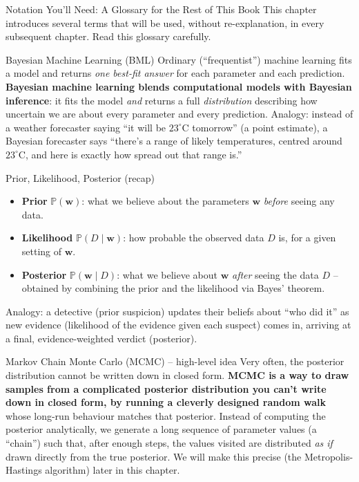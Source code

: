 \documentclass[aspectratio=169,10pt]{beamer}
\begin{document}
\begin{frame}[allowframebreaks]{Notation You'll Need: A Glossary for the Rest of This Book}
  This chapter introduces several terms that will be used, without
  re-explanation, in every subsequent chapter. Read this glossary carefully.

  \begin{block}{Bayesian Machine Learning (BML)}
    Ordinary (``frequentist'') machine learning fits a model and returns
    \emph{one best-fit answer} for each parameter and each prediction.
    \textbf{Bayesian machine learning blends computational models with
    Bayesian inference}: it fits the model \emph{and} returns a full
    \emph{distribution} describing how uncertain we are about every
    parameter and every prediction. Analogy: instead of a weather forecaster
    saying ``it will be $23^\circ$C tomorrow'' (a point estimate), a Bayesian
    forecaster says ``there's a range of likely temperatures, centred around
    $23^\circ$C, and here is exactly how spread out that range is.''
  \end{block}

  \begin{block}{Prior, Likelihood, Posterior (recap)}
    \begin{itemize}
      \item \textbf{Prior} $\mathbb{P}(\mathbf{w})$: what we believe about
        the parameters $\mathbf{w}$ \emph{before} seeing any data.
      \item \textbf{Likelihood} $\mathbb{P}(D\mid \mathbf{w})$: how probable
        the observed data $D$ is, for a given setting of $\mathbf{w}$.
      \item \textbf{Posterior} $\mathbb{P}(\mathbf{w}\mid D)$: what we
        believe about $\mathbf{w}$ \emph{after} seeing the data $D$ --
        obtained by combining the prior and the likelihood via Bayes'
        theorem.
    \end{itemize}
    Analogy: a detective (prior suspicion) updates their beliefs about
    ``who did it'' as new evidence (likelihood of the evidence given each
    suspect) comes in, arriving at a final, evidence-weighted verdict
    (posterior).
  \end{block}

  \framebreak

  \begin{block}{Markov Chain Monte Carlo (MCMC) -- high-level idea}
    Very often, the posterior distribution cannot be written down in closed
    form. \textbf{MCMC is a way to draw samples from a complicated posterior
    distribution you can't write down in closed form, by running a
    cleverly designed random walk} whose long-run behaviour matches that
    posterior. Instead of computing the posterior analytically, we generate
    a long sequence of parameter values (a ``chain'') such that, after
    enough steps, the values visited are distributed \emph{as if} drawn
    directly from the true posterior. We will make this precise (the
    Metropolis-Hastings algorithm) later in this chapter.
  \end{block}


\end{frame}
\end{document}

